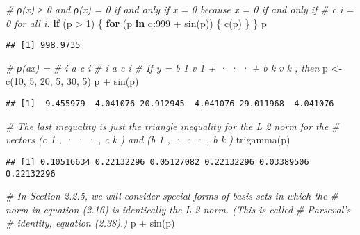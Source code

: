 \documentclass[
]{article}
\newenvironment{Shaded}{\begin{snugshade}}{\end{snugshade}}
\newcommand{\CommentTok}[1]{\textcolor[rgb]{0.56,0.35,0.01}{\textit{#1}}}
\newcommand{\ControlFlowTok}[1]{\textcolor[rgb]{0.13,0.29,0.53}{\textbf{#1}}}
\newcommand{\DecValTok}[1]{\textcolor[rgb]{0.00,0.00,0.81}{#1}}
\newcommand{\FunctionTok}[1]{\textcolor[rgb]{0.00,0.00,0.00}{#1}}
\newcommand{\NormalTok}[1]{#1}
\newcommand{\OtherTok}[1]{\textcolor[rgb]{0.56,0.35,0.01}{#1}}
\newcommand{\SpecialCharTok}[1]{\textcolor[rgb]{0.00,0.00,0.00}{#1}}
\begin{document}
\begin{Shaded}
\begin{Highlighting}[]
\CommentTok{\# ρ(x) ≥ 0 and ρ(x) = 0 if and only if x = 0 because x = 0 if and only if}
\CommentTok{\# c i = 0 for all i.}
\ControlFlowTok{if}\NormalTok{ (p }\SpecialCharTok{\textgreater{}} \DecValTok{1}\NormalTok{) \{}
   \ControlFlowTok{for}\NormalTok{ (p }\ControlFlowTok{in}\NormalTok{ q}\SpecialCharTok{:}\DecValTok{999} \SpecialCharTok{+} \FunctionTok{sin}\NormalTok{(p)) \{}
     \FunctionTok{c}\NormalTok{(p)}
\NormalTok{   \}}
\NormalTok{\}}
\NormalTok{p}
\end{Highlighting}
\end{Shaded}

\begin{verbatim}
## [1] 998.9735
\end{verbatim}

\begin{Shaded}
\begin{Highlighting}[]
\CommentTok{\# ρ(ax) =}
\CommentTok{\# i a c i}
\CommentTok{\# i a c i}
\CommentTok{\# If y = b 1 v 1 + · · · + b k v k , then}
\NormalTok{p }\OtherTok{\textless{}{-}} \FunctionTok{c}\NormalTok{(}\DecValTok{10}\NormalTok{, }\DecValTok{5}\NormalTok{, }\DecValTok{20}\NormalTok{, }\DecValTok{5}\NormalTok{, }\DecValTok{30}\NormalTok{, }\DecValTok{5}\NormalTok{)}
\NormalTok{p }\SpecialCharTok{+} \FunctionTok{sin}\NormalTok{(p)}
\end{Highlighting}
\end{Shaded}

\begin{verbatim}
## [1]  9.455979  4.041076 20.912945  4.041076 29.011968  4.041076
\end{verbatim}

\begin{Shaded}
\begin{Highlighting}[]
\CommentTok{\# The last inequality is just the triangle inequality for the L 2 norm for the}
\CommentTok{\# vectors (c 1 , · · · , c k ) and (b 1 , · · · , b k )}
\FunctionTok{trigamma}\NormalTok{(p)}
\end{Highlighting}
\end{Shaded}

\begin{verbatim}
## [1] 0.10516634 0.22132296 0.05127082 0.22132296 0.03389506 0.22132296
\end{verbatim}

\begin{Shaded}
\begin{Highlighting}[]
\CommentTok{\# In Section 2.2.5, we will consider special forms of basis sets in which the}
\CommentTok{\# norm in equation (2.16) is identically the L 2 norm. (This is called }
\CommentTok{\# Parseval’s}
\CommentTok{\# identity, equation (2.38).)}
\NormalTok{p }\SpecialCharTok{+} \FunctionTok{sin}\NormalTok{(p)}
\end{Highlighting}
\end{Shaded}
\end{document}
